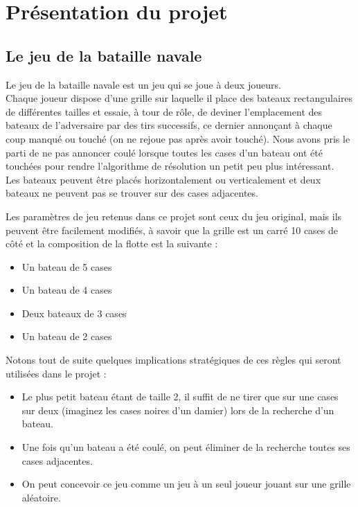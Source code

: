 \chapter{Présentation du projet}

\section{Le jeu de la bataille navale}
Le jeu de la bataille navale est un jeu qui se joue à deux joueurs.\\
Chaque joueur dispose d'une grille sur laquelle il place des bateaux rectangulaires de différentes tailles et essaie, à tour de rôle, de deviner l'emplacement des bateaux de l'adversaire par des tirs successifs, ce dernier annonçant à chaque coup \og manqué \fg{} ou \og touché \fg{} (on ne rejoue pas après avoir touché). Nous avons pris le parti de ne pas annoncer \og coulé \fg{} lorsque toutes les cases d'un bateau ont été touchées pour rendre l'algorithme de résolution un petit peu plus intéressant.\\
Les bateaux peuvent être placés horizontalement ou verticalement et deux bateaux ne peuvent pas se trouver sur des cases adjacentes.

Les paramètres de jeu retenus dans ce projet sont ceux du jeu original, mais ils peuvent être facilement modifiés, à savoir que la grille est un carré 10 cases de côté et la composition de la flotte est la suivante :
\begin{itemize}
\item Un bateau de 5 cases
\item Un bateau de 4 cases
\item Deux bateaux de 3 cases
\item Un bateau de 2 cases
\end{itemize}

\medskip

Notons tout de suite quelques implications stratégiques de ces règles qui seront utilisées dans le projet :
\begin{itemize}
\item Le plus petit bateau étant de taille 2, il suffit de ne tirer que sur une cases sur deux (imaginez les cases noires d'un damier) lors de la recherche d'un bateau.
\item Une fois qu'un bateau a été coulé, on peut éliminer de la recherche toutes ses cases adjacentes.
\item On peut concevoir ce jeu comme un jeu à un seul joueur jouant sur une grille aléatoire.
\end{itemize}

